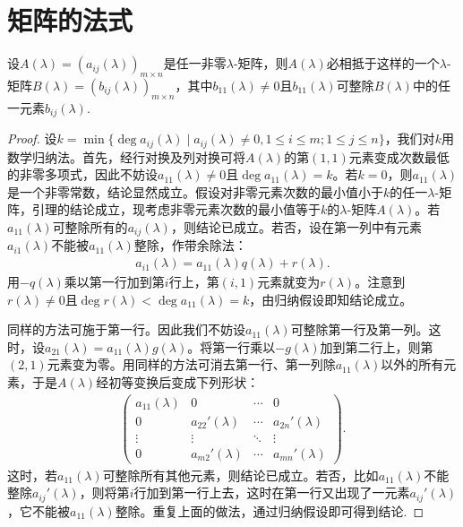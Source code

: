 \documentclass[../../main.tex]{subfiles}
\begin{document}
\section{矩阵的法式}

\begin{lemma}\label{lemma:lambda矩阵一定相抵于b_11整除所有元素的矩阵}
设$A(\lambda)=(a_{ij}(\lambda))_{m\times n}$是任一非零$\lambda$-矩阵，则$A(\lambda)$必相抵于这样的一个$\lambda$-矩阵$B(\lambda)=(b_{ij}(\lambda))_{m\times n}$，其中$b_{11}(\lambda)\neq 0$且$b_{11}(\lambda)$可整除$B(\lambda)$中的任一元素$b_{ij}(\lambda)$.
\end{lemma}
\begin{proof}
设$k = \min\{\deg a_{ij}(\lambda)\mid a_{ij}(\lambda)\neq 0, 1\leq i\leq m; 1\leq j\leq n\}$，我们对$k$用数学归纳法。首先，经行对换及列对换可将$A(\lambda)$的第$(1,1)$元素变成次数最低的非零多项式，因此不妨设$a_{11}(\lambda)\neq 0$且$\deg a_{11}(\lambda)=k$。若$k = 0$，则$a_{11}(\lambda)$是一个非零常数，结论显然成立。假设对非零元素次数的最小值小于$k$的任一$\lambda$-矩阵，引理的结论成立，现考虑非零元素次数的最小值等于$k$的$\lambda$-矩阵$A(\lambda)$。若$a_{11}(\lambda)$可整除所有的$a_{ij}(\lambda)$，则结论已成立。若否，设在第一列中有元素$a_{i1}(\lambda)$不能被$a_{11}(\lambda)$整除，作带余除法：
\begin{align*}
a_{i1}(\lambda)=a_{11}(\lambda)q(\lambda)+r(\lambda).
\end{align*}
用$-q(\lambda)$乘以第一行加到第$i$行上，第$(i,1)$元素就变为$r(\lambda)$。注意到$r(\lambda)\neq 0$且$\deg r(\lambda)<\deg a_{11}(\lambda)=k$，由归纳假设即知结论成立。

同样的方法可施于第一行。因此我们不妨设$a_{11}(\lambda)$可整除第一行及第一列。这时，设$a_{21}(\lambda)=a_{11}(\lambda)g(\lambda)$。将第一行乘以$-g(\lambda)$加到第二行上，则第$(2,1)$元素变为零。用同样的方法可消去第一行、第一列除$a_{11}(\lambda)$以外的所有元素，于是$A(\lambda)$经初等变换后变成下列形状：
\begin{align*}
\begin{pmatrix}
a_{11}(\lambda)&0&\cdots&0\\
0&a_{22}'(\lambda)&\cdots&a_{2n}'(\lambda)\\
\vdots&\vdots&\ddots&\vdots\\
0&a_{m2}'(\lambda)&\cdots&a_{mn}'(\lambda)
\end{pmatrix}.
\end{align*}
这时，若$a_{11}(\lambda)$可整除所有其他元素，则结论已成立。若否，比如$a_{11}(\lambda)$不能整除$a_{ij}'(\lambda)$，则将第$i$行加到第一行上去，这时在第一行又出现了一元素$a_{ij}'(\lambda)$，它不能被$a_{11}(\lambda)$整除。重复上面的做法，通过归纳假设即可得到结论.
\end{proof}
\end{document}

